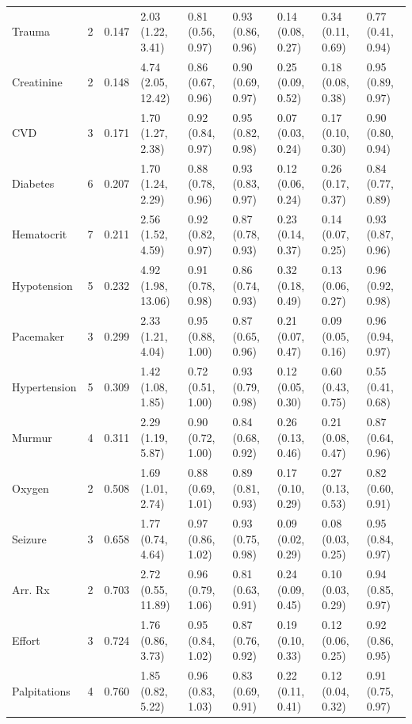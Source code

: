 \documentclass[AMA,STIX1COL]{WileyNJD-v2}
\begin{document}
\begin{table}
\begin{tabular}{lclllllll}
  Trauma &    2 & 0.147 & 2.03 (1.22, 3.41) & 0.81 (0.56, 0.97) & 0.93 (0.86, 0.96) & 0.14 (0.08, 0.27) & 0.34 (0.11, 0.69) & 0.77 (0.41, 0.94) \\ 
  Creatinine &    2 & 0.148 & 4.74 (2.05, 12.42) & 0.86 (0.67, 0.96) & 0.90 (0.69, 0.97) & 0.25 (0.09, 0.52) & 0.18 (0.08, 0.38) & 0.95 (0.89, 0.97) \\ 
  CVD &    3 & 0.171 & 1.70 (1.27, 2.38) & 0.92 (0.84, 0.97) & 0.95 (0.82, 0.98) & 0.07 (0.03, 0.24) & 0.17 (0.10, 0.30) & 0.90 (0.80, 0.94) \\ 
  Diabetes &    6 & 0.207 & 1.70 (1.24, 2.29) & 0.88 (0.78, 0.96) & 0.93 (0.83, 0.97) & 0.12 (0.06, 0.24) & 0.26 (0.17, 0.37) & 0.84 (0.77, 0.89) \\ 
  Hematocrit &    7 & 0.211 & 2.56 (1.52, 4.59) & 0.92 (0.82, 0.97) & 0.87 (0.78, 0.93) & 0.23 (0.14, 0.37) & 0.14 (0.07, 0.25) & 0.93 (0.87, 0.96) \\ 
  Hypotension &    5 & 0.232 & 4.92 (1.98, 13.06) & 0.91 (0.78, 0.98) & 0.86 (0.74, 0.93) & 0.32 (0.18, 0.49) & 0.13 (0.06, 0.27) & 0.96 (0.92, 0.98) \\ 
  Pacemaker &    3 & 0.299 & 2.33 (1.21, 4.04) & 0.95 (0.88, 1.00) & 0.87 (0.65, 0.96) & 0.21 (0.07, 0.47) & 0.09 (0.05, 0.16) & 0.96 (0.94, 0.97) \\ 
  Hypertension &    5 & 0.309 & 1.42 (1.08, 1.85) & 0.72 (0.51, 1.00) & 0.93 (0.79, 0.98) & 0.12 (0.05, 0.30) & 0.60 (0.43, 0.75) & 0.55 (0.41, 0.68) \\ 
  Murmur &    4 & 0.311 & 2.29 (1.19, 5.87) & 0.90 (0.72, 1.00) & 0.84 (0.68, 0.92) & 0.26 (0.13, 0.46) & 0.21 (0.08, 0.47) & 0.87 (0.64, 0.96) \\ 
  Oxygen &    2 & 0.508 & 1.69 (1.01, 2.74) & 0.88 (0.69, 1.01) & 0.89 (0.81, 0.93) & 0.17 (0.10, 0.29) & 0.27 (0.13, 0.53) & 0.82 (0.60, 0.91) \\ 
  Seizure &    3 & 0.658 & 1.77 (0.74, 4.64) & 0.97 (0.86, 1.02) & 0.93 (0.75, 0.98) & 0.09 (0.02, 0.29) & 0.08 (0.03, 0.25) & 0.95 (0.84, 0.97) \\ 
  Arr. Rx &    2 & 0.703 & 2.72 (0.55, 11.89) & 0.96 (0.79, 1.06) & 0.81 (0.63, 0.91) & 0.24 (0.09, 0.45) & 0.10 (0.03, 0.29) & 0.94 (0.85, 0.97) \\ 
  Effort &    3 & 0.724 & 1.76 (0.86, 3.73) & 0.95 (0.84, 1.02) & 0.87 (0.76, 0.92) & 0.19 (0.10, 0.33) & 0.12 (0.06, 0.25) & 0.92 (0.86, 0.95) \\ 
  Palpitations &    4 & 0.760 & 1.85 (0.82, 5.22) & 0.96 (0.83, 1.03) & 0.83 (0.69, 0.91) & 0.22 (0.11, 0.41) & 0.12 (0.04, 0.32) & 0.91 (0.75, 0.97) \\ 

\end{tabular}
\end{table}
\end{document}
